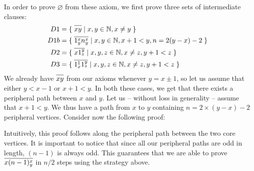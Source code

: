 In order to prove $\varnothing$ from these axiom, we first prove three sets of intermediate clauses:
\begin{align}
  D1 &= \{\; \ol{xy} \;|\; x,y \in \mathbb{N}, x \neq y \; \} \\
  D1b &= \{\; \ol{1^x_yn^x_y} \;|\; x,y \in \mathbb{N}, x+1 < y, n = 2(y-x)-2 \; \} \\
  D2 &= \{\; \ol{x1^y_z} \;|\; x,y,z \in \mathbb{N}, x \neq z, y+1 < z \; \} \\
  D3 &= \{\; \ol{1^1_x1^y_z} \;|\; x,y,z \in \mathbb{N}, x \neq z, y+1 < z \; \}
\end{align}
We already have $\ol{xy}$ from our axioms whenever $y = x \pm 1$, so let us assume that either $y < x-1$ or $x + 1 < y$.
In both these cases, we get that there exists a peripheral path between $x$ and $y$.
Let us -- without loss in generality -- assume that $x + 1 < y$.
We thus have a path from $x$ to $y$ containing $n = 2 \times (y - x) - 2$ peripheral vertices.
Consider now the following proof:
\begin{prooftree*}
\end{prooftree*}
Intuitively, this proof follows along the peripheral path between the two core vertices.
It is important to notice that since all our peripheral paths are odd in length, $(n-1)$ is always odd.
This guarantees that we are able to prove $\ol{x(n-1)^x_y}$ in $n/2$ steps using the strategy above.

